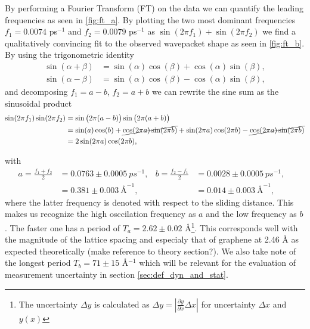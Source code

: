 By performing a Fourier Transform (FT) on the data we can quantify the leading frequencies as seen in \cref{fig:ft_a}. By plotting the two most dominant frequencies $f_1 = 0.0074$ ps$^{-1}$ and $f_2 = 0.0079$ ps$^{-1}$ as $\sin{(2\pi f_1)} + \sin{(2\pi f_2)}$ we find a qualitatively convincing fit to the observed wavepacket shape as seen in \cref{fig:ft_b}. By using the trigonometric identity
\begin{align*}
\sin (\alpha+\beta) &= \sin (\alpha) \cos (\beta) + \cos (\alpha) \sin (\beta), \\
\sin (\alpha-\beta) &= \sin (\alpha) \cos (\beta) - \cos (\alpha) \sin (\beta),
\end{align*}
and decomposing $f_1 = a - b$, $f_2 = a + b$ we can rewrite the sine sum as the sinusoidal product
\begin{align*}
  \sin(2\pi f_1) \sin(2\pi f_2) &= \sin\big(2\pi (a - b)\big) \sin\big(2\pi (a + b)\big) \\
  &= \sin(a)\cos(b) + \cancel{\cos(2\pi a)\sin(2\pi b)} + \sin(2\pi a)\cos(2\pi b) - \cancel{\cos(2\pi a)\sin(2\pi b)} \\
  &= 2 \sin(2\pi a) \cos(2\pi b),
\end{align*} 

with 
\begin{align*}
  a = \frac{f_1 + f_2}{2} &= 0.0763 \pm \SI{0.0005}{ps^{-1}},& 
  b = \frac{f_2 - f_1}{2} &= 0.0028 \pm \SI{0.0005}{ps^{-1}},& \\
  &= 0.381 \pm \SI{0.003}{{\text{Å}}^{-1}},& 
  &= 0.014 \pm \SI{0.003}{{\text{Å}}^{-1}},& 
\end{align*}
where the latter frequency is denoted with respect to the sliding distance. This makes us recognize the high osccilation frequency as $a$ and the low frequency as $b$. The faster one has a period of $T_a = 2.62 \pm 0.02$ Å\footnote{The uncertainty $\Delta y$ is calculated as $\Delta y = \left|\frac{\partial y}{\partial x} \Delta x \right|$ for uncertainty $\Delta x$ and $y(x)$}. This corresponds well with the magnitude of the lattice spacing and especialy that of graphene at 2.46 Å as expected theoretically (make reference to theory section?). We also take note of the longest period $T_b = 71 \pm 15$ Å$^{-1}$ which will be relevant for the evaluation of measurement uncertainty in section \cref{sec:def_dyn_and_stat}.

